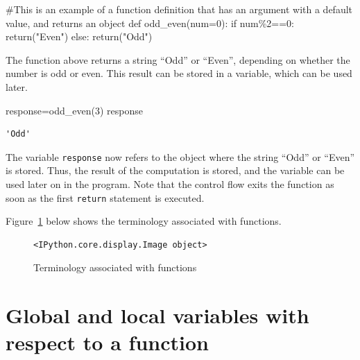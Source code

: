 \documentclass[
  letterpaper,
  DIV=11,
  numbers=noendperiod]{scrreprt}
\newenvironment{Shaded}{\begin{snugshade}}{\end{snugshade}}
\newcommand{\CommentTok}[1]{\textcolor[rgb]{0.37,0.37,0.37}{#1}}
\newcommand{\ControlFlowTok}[1]{\textcolor[rgb]{0.00,0.23,0.31}{#1}}
\newcommand{\DecValTok}[1]{\textcolor[rgb]{0.68,0.00,0.00}{#1}}
\newcommand{\KeywordTok}[1]{\textcolor[rgb]{0.00,0.23,0.31}{#1}}
\newcommand{\NormalTok}[1]{\textcolor[rgb]{0.00,0.23,0.31}{#1}}
\newcommand{\OperatorTok}[1]{\textcolor[rgb]{0.37,0.37,0.37}{#1}}
\newcommand{\StringTok}[1]{\textcolor[rgb]{0.13,0.47,0.30}{#1}}
\begin{document}
\begin{Shaded}
\begin{Highlighting}[]
\CommentTok{\#This is an example of a function definition that has an argument with a default value, and returns an object}
\KeywordTok{def}\NormalTok{ odd\_even(num}\OperatorTok{=}\DecValTok{0}\NormalTok{):           }
    \ControlFlowTok{if}\NormalTok{ num}\OperatorTok{\%}\DecValTok{2}\OperatorTok{==}\DecValTok{0}\NormalTok{:}
        \ControlFlowTok{return}\NormalTok{(}\StringTok{"Even"}\NormalTok{)}
    \ControlFlowTok{else}\NormalTok{:}
        \ControlFlowTok{return}\NormalTok{(}\StringTok{"Odd"}\NormalTok{)}
\end{Highlighting}
\end{Shaded}

The function above returns a string ``Odd'' or ``Even'', depending on
whether the number is odd or even. This result can be stored in a
variable, which can be used later.

\begin{Shaded}
\begin{Highlighting}[]
\NormalTok{response}\OperatorTok{=}\NormalTok{odd\_even(}\DecValTok{3}\NormalTok{)}
\NormalTok{response}
\end{Highlighting}
\end{Shaded}

\begin{verbatim}
'Odd'
\end{verbatim}

The variable \texttt{response} now refers to the object where the string
``Odd'' or ``Even'' is stored. Thus, the result of the computation is
stored, and the variable can be used later on in the program. Note that
the control flow exits the function as soon as the first \texttt{return}
statement is executed.

Figure~\ref{fig-fun} below shows the terminology associated with
functions.

\begin{figure}

{\centering 

\begin{verbatim}
<IPython.core.display.Image object>
\end{verbatim}

}

\caption{\label{fig-fun}Terminology associated with functions}

\end{figure}

\hypertarget{global-and-local-variables-with-respect-to-a-function}{%
\section{Global and local variables with respect to a
function}\label{global-and-local-variables-with-respect-to-a-function}}
\end{document}
